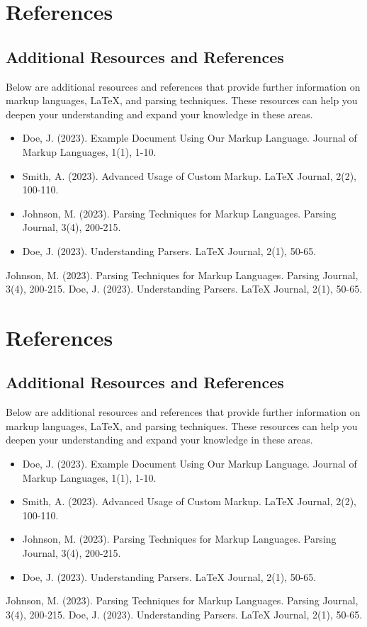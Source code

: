 \documentclass[oneside]{book}
\begin{document}
\chapter{References}
\section{Additional Resources and References}
Below are additional resources and references that provide further information on markup languages, LaTeX, and parsing techniques. These resources can help you deepen your understanding and expand your knowledge in these areas.\par
\begin{itemize}
\item Doe, J. (2023). Example Document Using Our Markup Language. Journal of Markup Languages, 1(1), 1-10.
\item Smith, A. (2023). Advanced Usage of Custom Markup. LaTeX Journal, 2(2), 100-110.
\item Johnson, M. (2023). Parsing Techniques for Markup Languages. Parsing Journal, 3(4), 200-215.
\item Doe, J. (2023). Understanding Parsers. LaTeX Journal, 2(1), 50-65.
\end{itemize}
\begin{thebibliography}{100}
Johnson, M. (2023). Parsing Techniques for Markup Languages. Parsing Journal, 3(4), 200-215.
Doe, J. (2023). Understanding Parsers. LaTeX Journal, 2(1), 50-65.
\end{thebibliography}

\newpage
\chapter{References}
\section{Additional Resources and References}
Below are additional resources and references that provide further information on markup languages, LaTeX, and parsing techniques. These resources can help you deepen your understanding and expand your knowledge in these areas.\par
\begin{itemize}
\item Doe, J. (2023). Example Document Using Our Markup Language. Journal of Markup Languages, 1(1), 1-10.
\item Smith, A. (2023). Advanced Usage of Custom Markup. LaTeX Journal, 2(2), 100-110.
\item Johnson, M. (2023). Parsing Techniques for Markup Languages. Parsing Journal, 3(4), 200-215.
\item Doe, J. (2023). Understanding Parsers. LaTeX Journal, 2(1), 50-65.
\end{itemize}
\begin{thebibliography}{100}
Johnson, M. (2023). Parsing Techniques for Markup Languages. Parsing Journal, 3(4), 200-215.
Doe, J. (2023). Understanding Parsers. LaTeX Journal, 2(1), 50-65.
\end{thebibliography}
\end{document}
